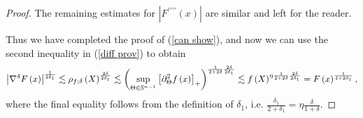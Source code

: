 \documentclass{amsart}
\theoremstyle{plain}
\numberwithin{equation}{section}
\begin{document}
\begin{proof}
The remaining estimates for $\left\vert F^{\prime \prime \prime \prime
}\left( x\right) \right\vert $ are similar and left for the reader.

Thus we have completed the proof of (\ref{can show}), and now we can use the
second inequality in (\ref{diff prov}) to obtain%
\begin{equation*}
\left\vert \nabla ^{4}F\left( x\right) \right\vert ^{\frac{1}{2\delta _{1}}%
}\lesssim \rho _{f;\delta }\left( X\right) ^{\frac{2\delta }{2\delta _{1}}%
}\lesssim \left( \sup_{\Theta \in \mathbb{S}^{n-1}}\left[ \partial _{\Theta
}^{2}f\left( x\right) \right] _{+}\right) ^{\frac{1}{2+2\delta }\frac{%
2\delta }{2\delta _{1}}}\lesssim f\left( X\right) ^{\eta \frac{1}{2+2\delta }%
\frac{2\delta }{2\delta _{1}}}=F\left( x\right) ^{\frac{1}{4+2\delta _{1}}},
\end{equation*}%
where the final equality follows from the definition of $\delta _{1}$, i.e. $%
\frac{\delta _{1}}{2+\delta _{1}}=\eta \frac{\delta }{1+\delta }$.


\end{proof}
\end{document}
